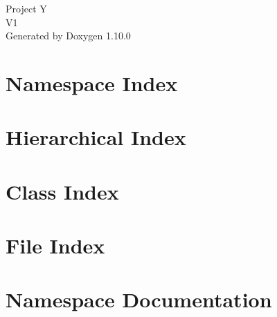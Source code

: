 \documentclass[twoside]{book}
\newcommand{\+}{\discretionary{\mbox{\scriptsize$\hookleftarrow$}}{}{}}
\newcommand{\clearemptydoublepage}{%
    \newpage{\pagestyle{empty}\cleardoublepage}%
  }
\begin{document}
  \raggedbottom
    \hypersetup{pageanchor=false,
                bookmarksnumbered=true,
                pdfencoding=unicode
               }
  \begin{titlepage}
  \vspace*{7cm}
  \begin{center}%
  {\Large Project Y}\\
  [1ex]\large V1 \\
  \vspace*{1cm}
  {\large Generated by Doxygen 1.10.0}\\
  \end{center}
  \end{titlepage}
  \clearemptydoublepage
  \tableofcontents
  \clearemptydoublepage
  \hypersetup{pageanchor=true}
\chapter{Namespace Index}

\chapter{Hierarchical Index}

\chapter{Class Index}

\chapter{File Index}

\chapter{Namespace Documentation}





\end{document}
